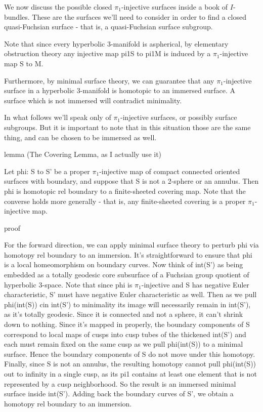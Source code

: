 We now discuss the possible closed $\pi_1$-injective surfaces inside a book of
$I$-bundles. These are the surfaces we'll need to consider in order to find
a closed quasi-Fuchsian surface - that is, a quasi-Fuchsian surface subgroup.

Note that since every hyperbolic 3-manifold is aspherical, by elementary
obstruction theory any injective map pi1S to pi1M is induced by a $\pi_1$-injective
map S to M.

Furthermore, by minimal surface theory, we can guarantee that any $\pi_1$-injective
surface in a hyperbolic 3-manifold is homotopic to an immersed surface.
A surface which is not immersed will contradict minimality.

In what follows we'll speak only of $\pi_1$-injective surfaces, or possibly surface
subgroups. But it is important to note that in this situation those are the
same thing, and can be chosen to be immersed as well.

lemma (The Covering Lemma, as I actually use it)

Let phi: S to S' be a proper $\pi_1$-injective map of compact connected oriented
surfaces with boundary, and suppose that S is not a 2-sphere or an annulus.
Then phi is homotopic rel boundary to a finite-sheeted covering map.  Note that
the converse holds more generally - that is, any finite-sheeted covering is
a proper $\pi_1$-injective map.

proof

For the forward direction, we can apply minimal surface theory to perturb phi
via homotopy rel boundary to an immersion. It's straightforward to ensure that
phi is a local homeomorphism on boundary curves. Now think of int(S') as being
embedded as a totally geodesic core subsurface of a Fuchsian group quotient of
hyperbolic 3-space. Note that since phi is $\pi_1$-injective and S has negative
Euler characteristic, S' must have negative Euler characteristic as well. Then
as we pull phi(int(S)) cin int(S') to minimality its image will necessarily
remain in int(S'), as it's totally geodesic.  Since it is connected and not
a sphere, it can't shrink down to nothing. Since it's mapped in properly, the
boundary components of S correspond to local maps of cusps into cusp tubes of
the thickened int(S') and each must remain fixed on the same cusp as we pull
phi(int(S)) to a minimal surface.  Hence the boundary components of S do not
move under this homotopy.  Finally, since S is not an annulus, the resulting
homotopy cannot pull phi(int(S)) out to infinity in a single cusp, as its pi1
contains at least one element that is not represented by a cusp neighborhood.
So the result is an immersed minimal surface inside int(S'). Adding back the
boundary curves of S', we obtain a homotopy rel boundary to an immersion.

